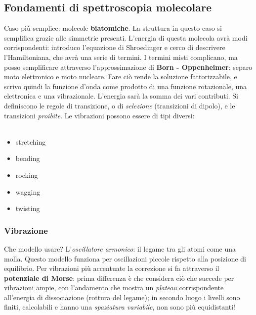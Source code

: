 \subsection*{Fondamenti di spettroscopia molecolare}
Caso più semplice: molecole \textbf{biatomiche}. 
La struttura in questo caso si semplifica grazie alle simmetrie presenti.
L'energia di questa molecola avrà modi corrispondenti: introduco l'equazione di Shroedinger e cerco di descrivere l'Hamiltoniana, che avrà una serie di termini.
I termini misti complicano, ma posso semplificare attraverso l'approssimazione di \textbf{Born - Oppenheimer}: separo moto elettronico e moto nucleare.
Fare ciò rende la soluzione fattorizzabile, e scrivo quindi la funzione d'onda come prodotto di una funzione rotazionale, una elettronica e una vibrazionale.
L'energia sarà la somma dei vari contributi.
Si definiscono le regole di transizione, o di \textit{selezione} (transizioni di dipolo), e le transizioni \textit{proibite}.
Le vibrazioni possono essere di tipi diversi:\\\\
\begin{itemize}
    \item stretching
    \item bending
    \item rocking
    \item wagging
    \item twisting
\end{itemize}
\subsubsection{Vibrazione}
Che modello usare? L'\textit{oscillatore armonico}: il legame tra gli atomi come una molla.
Questo modello funziona per oscillazioni piccole rispetto alla posizione di equilibrio.
Per vibrazioni più accentuate la correzione si fa attraverso il \textbf{potenziale di Morse}: prima differenza è che considera ciò che succede per vibrazioni ampie, con l'andamento che mostra un \textit{plateau} corrispondente all'energia di dissociazione (rottura del legame); in secondo luogo i livelli sono finiti, calcolabili e hanno una \textit{spaziatura variabile}, non sono più equidistanti!
